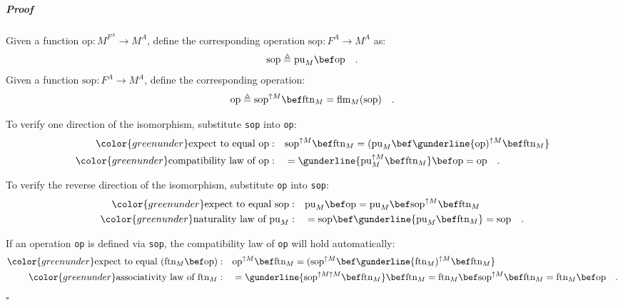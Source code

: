 \subparagraph{Proof}

Given a function $\text{op}:M^{F^{A}}\rightarrow M^{A}$, define the
corresponding operation $\text{sop}:F^{A}\rightarrow M^{A}$ as:
\[
\text{sop}\triangleq\text{pu}_{M}\bef\text{op}\quad.
\]
Given a function $\text{sop}:F^{A}\rightarrow M^{A}$, define the
corresponding operation:
\[
\text{op}\triangleq\text{sop}^{\uparrow M}\bef\text{ftn}_{M}=\text{flm}_{M}(\text{sop})\quad.
\]

To verify one direction of the isomorphism, substitute \lstinline!sop!
into \lstinline!op!:
\begin{align*}
{\color{greenunder}\text{expect to equal }\text{op}:}\quad & \text{sop}^{\uparrow M}\bef\text{ftn}_{M}=(\text{pu}_{M}\bef\gunderline{\text{op})^{\uparrow M}\bef\text{ftn}_{M}}\\
{\color{greenunder}\text{compatibility law of }\text{op}:}\quad & =\gunderline{\text{pu}_{M}^{\uparrow M}\bef\text{ftn}_{M}}\bef\text{op}=\text{op}\quad.
\end{align*}

To verify the reverse direction of the isomorphism, substitute \lstinline!op!
into \lstinline!sop!:
\begin{align*}
{\color{greenunder}\text{expect to equal }\text{sop}:}\quad & \text{pu}_{M}\bef\text{op}=\text{pu}_{M}\bef\text{sop}^{\uparrow M}\bef\text{ftn}_{M}\\
{\color{greenunder}\text{naturality law of }\text{pu}_{M}:}\quad & =\text{sop}\bef\gunderline{\text{pu}_{M}\bef\text{ftn}_{M}}=\text{sop}\quad.
\end{align*}

If an operation \lstinline!op! is defined via \lstinline!sop!, the
compatibility law of \lstinline!op! will hold automatically:
\begin{align*}
{\color{greenunder}\text{expect to equal }(\text{ftn}_{M}\bef\text{op}):}\quad & \text{op}^{\uparrow M}\bef\text{ftn}_{M}=(\text{sop}^{\uparrow M}\bef\gunderline{\text{ftn}_{M})^{\uparrow M}\bef\text{ftn}_{M}}\\
{\color{greenunder}\text{associativity law of }\text{ftn}_{M}:}\quad & =\gunderline{\text{sop}^{\uparrow M\uparrow M}\bef\text{ftn}_{M}}\bef\text{ftn}_{M}=\text{ftn}_{M}\bef\text{sop}^{\uparrow M}\bef\text{ftn}_{M}=\text{ftn}_{M}\bef\text{op}\quad.
\end{align*}
$\square$

